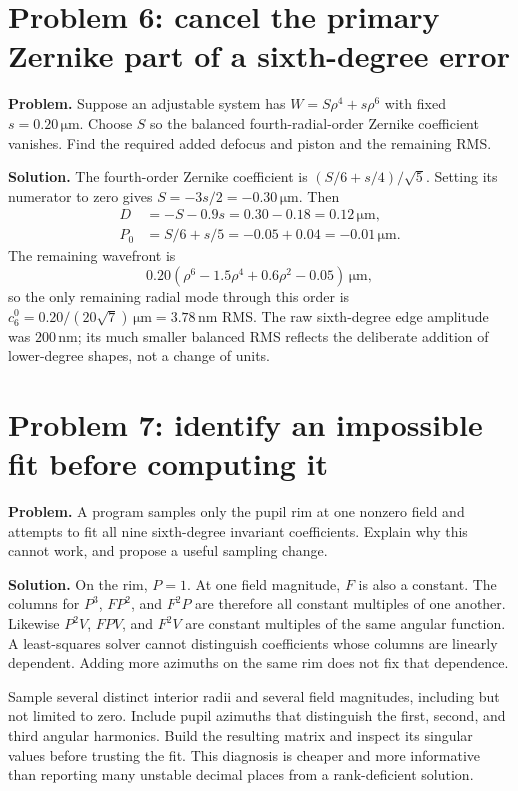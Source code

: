 \section{Problem 6: cancel the primary Zernike part of a sixth-degree error}
\textbf{Problem.} Suppose an adjustable system has
$W=S\rho^4+s\rho^6$ with fixed $s=0.20\,\mathrm{\mu m}$. Choose $S$
so the balanced fourth-radial-order Zernike coefficient vanishes. Find the
required added defocus and piston and the remaining RMS.

\textbf{Solution.} The fourth-order Zernike coefficient is
$(S/6+s/4)/\sqrt5$. Setting its numerator to zero gives
$S=-3s/2=-0.30\,\mathrm{\mu m}$. Then
\begin{align}
 D&=-S-0.9s=0.30-0.18=0.12\,\mathrm{\mu m},\\
 P_0&=S/6+s/5=-0.05+0.04=-0.01\,\mathrm{\mu m}.
\end{align}
The remaining wavefront is
\begin{equation}
 0.20\left(\rho^6-1.5\rho^4+0.6\rho^2-0.05\right)
       \,\mathrm{\mu m},
\end{equation}
so the only remaining radial mode through this order is
$c_6^0=0.20/(20\sqrt7)\,\mathrm{\mu m}=3.78\,\mathrm{nm}$ RMS.
The raw sixth-degree edge amplitude was $200\,\mathrm{nm}$; its much
smaller balanced RMS reflects the deliberate addition of lower-degree
shapes, not a change of units.

\section{Problem 7: identify an impossible fit before computing it}
\textbf{Problem.} A program samples only the pupil rim at one nonzero field
and attempts to fit all nine sixth-degree invariant coefficients. Explain
why this cannot work, and propose a useful sampling change.

\textbf{Solution.} On the rim, $P=1$. At one field magnitude, $F$ is also a
constant. The columns for $P^3$, $FP^2$, and $F^2P$ are therefore all
constant multiples of one another. Likewise $P^2V$, $FPV$, and $F^2V$ are
constant multiples of the same angular function. A least-squares solver
cannot distinguish coefficients whose columns are linearly dependent.
Adding more azimuths on the same rim does not fix that dependence.

Sample several distinct interior radii and several field magnitudes,
including but not limited to zero. Include pupil azimuths that distinguish
the first, second, and third angular harmonics. Build the resulting matrix
and inspect its singular values before trusting the fit. This diagnosis is
cheaper and more informative than reporting many unstable decimal places
from a rank-deficient solution.

